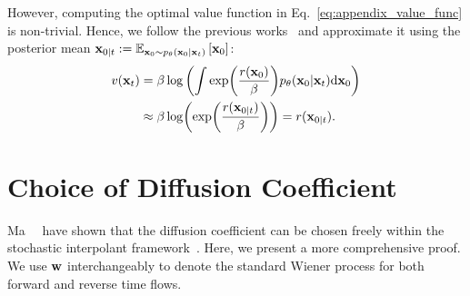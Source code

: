 However, computing the optimal value function in Eq.~\ref{eq:appendix_value_func} is non-trivial. 
Hence, we follow the previous works~\cite{Kim:2025DAS,Li2024:SVDD} and approximate it using the posterior mean 
$\mathbf{x}_{0|t} := \mathbb{E}_{\mathbf{x}_0\sim p_\theta (\mathbf{x}_0|\mathbf{x}_t)}\left[ \mathbf{x}_0\right]$:
\begin{align}
    \nonumber
    v(\mathbf{x}_t) &= \beta \log \left( \int \exp (\frac{r(\mathbf{x}_0)}{\beta}) p_\theta(\mathbf{x}_0 | \mathbf{x}_t) \mathrm{d} \mathbf{x}_0 \right) \\
    \label{eq:appendix_soft_value_func}
    &\approx \beta \log (\exp (\frac{r(\mathbf{x}_{0|t})}{\beta})) = r(\mathbf{x}_{0|t}). 
\end{align}



\section{Choice of Diffusion Coefficient}
\label{sec:appendix_diffusion_coefficient_choice}
Ma~\etal~\cite{Ma2024:sit} have shown that the diffusion coefficient can be chosen freely within the stochastic interpolant framework~\cite{Albergo:2023Interpolant}. 
Here, we present a more comprehensive proof. 
We use $\mathbf{w}$ interchangeably to denote the standard Wiener process for both forward and reverse time flows. 

